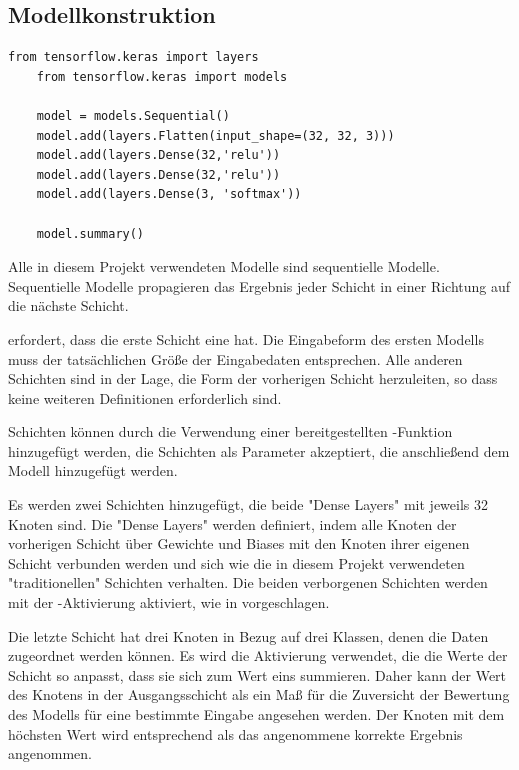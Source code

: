 \subsection{Modellkonstruktion}

\begin{lstlisting}[label={lst:first_model}]
    from tensorflow.keras import layers
    from tensorflow.keras import models
    
    model = models.Sequential()
    model.add(layers.Flatten(input_shape=(32, 32, 3)))
    model.add(layers.Dense(32,'relu'))
    model.add(layers.Dense(32,'relu'))
    model.add(layers.Dense(3, 'softmax'))
    
    model.summary()
\end{lstlisting}

Alle in diesem Projekt verwendeten Modelle sind sequentielle Modelle.
Sequentielle Modelle propagieren das Ergebnis jeder Schicht in einer Richtung auf die nächste Schicht.

 erfordert, dass die erste Schicht eine  hat.
Die Eingabeform des ersten Modells muss der tatsächlichen Größe der Eingabedaten entsprechen.
Alle anderen Schichten sind in der Lage, die Form der vorherigen Schicht herzuleiten, so dass keine weiteren Definitionen erforderlich sind.

Schichten können durch die Verwendung einer bereitgestellten -Funktion hinzugefügt werden, die Schichten als Parameter akzeptiert, die anschließend dem Modell hinzugefügt werden.

Es werden zwei Schichten hinzugefügt, die beide "Dense Layers" mit jeweils 32 Knoten sind.
Die "Dense Layers" werden definiert, indem alle Knoten der vorherigen Schicht über Gewichte und Biases mit den Knoten ihrer eigenen Schicht verbunden werden und sich wie die in diesem Projekt verwendeten "traditionellen" Schichten verhalten.
Die beiden verborgenen Schichten werden mit der -Aktivierung aktiviert, wie in \cite[S.168]{Goodfellow2017} vorgeschlagen.

Die letzte Schicht hat drei Knoten in Bezug auf drei Klassen, denen die Daten zugeordnet werden können.
Es wird die Aktivierung  verwendet, die die Werte der Schicht so anpasst, dass sie sich zum Wert eins summieren.
Daher kann der Wert des Knotens in der Ausgangsschicht als ein Maß für die Zuversicht der Bewertung des Modells für eine bestimmte Eingabe angesehen werden.
Der Knoten mit dem höchsten Wert wird entsprechend als das angenommene korrekte Ergebnis angenommen.

